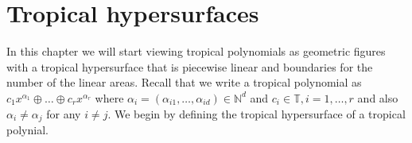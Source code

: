 \documentclass{article}
\theoremstyle{definition}
\newtheorem{lemma}[theorem]{Lemma}
\newtheorem{definition}[theorem]{Definition}
\begin{document}
\newpage

%

\section{Tropical hypersurfaces}
\label{sec:tropical_hypersurfaces}

In this chapter we will start viewing tropical polynomials as geometric figures with a tropical hypersurface that is piecewise linear and boundaries for the number of the linear areas. Recall that we write a tropical polynomial as $c_1 x^{\alpha_1} \oplus \dots \oplus c_r x^{\alpha_r}$ where $\alpha_i = (\alpha_{i1}, \dots , \alpha_{id}) \in \mathbb{N}^{d}$ and $c_i \in \mathbb{T}, i=1, \dots , r$ and also $\alpha_i \neq \alpha_j$ for any $i \neq j$. We begin by defining the tropical hypersurface of a tropical polynial. 
 
\end{document}
